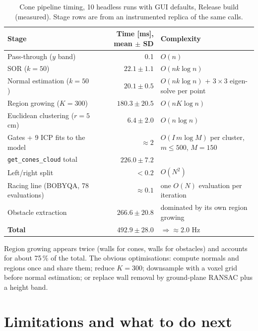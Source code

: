 \documentclass[10pt,a4paper]{scrartcl}
\newcommand{\code}[1]{\texttt{#1}}
\newcommand{\RuleSection}[1]{%
    \section{#1}%
    \vspace{0.2em}{\color{accent!35}\hrule height 0.4pt}\vspace{0.3em}%
  }
\begin{document}
  \begin{table}[H]
  \small
  \centering
  \renewcommand{\arraystretch}{1.05}
  \begin{tabular}{@{}lrl@{}}
  \toprule
  \textbf{Stage} & \textbf{Time [ms], mean $\pm$ SD} & \textbf{Complexity} \\
  \midrule
  Pass-through ($y$ band)            & 0.1          & $O(n)$ \\
  SOR ($k=50$)                      & $22.1\pm1.1$  & $O(nk\log n)$ \\
  Normal estimation ($k=50$)        & $20.1\pm0.5$  & $O(nk\log n)$ + $3\times3$ eigen-solve per point \\
  Region growing ($K=300$)          & $180.3\pm20.5$ & $O(nK\log n)$ \\
  Euclidean clustering ($r=5$ cm)    & $6.4\pm2.0$   & $O(n\log n)$ \\
  Gates + 9 ICP fits to the model   & $\approx2$    & $O(I\,m\log M)$ per cluster, $m\le500$, $M=150$ \\
  \quad \code{get\_cones\_cloud} total & $226.0\pm7.2$ & \\
  Left/right split                  & $<0.2$       & $O(N^2)$ \\
  Racing line (BOBYQA, 78 evaluations) & $\approx0.1$ & one $O(N)$ evaluation per iteration \\
  Obstacle extraction               & $266.6\pm20.8$ & dominated by its own region growing \\
  \textbf{Total}                    & $\bm{492.9\pm28.0}$ & $\Rightarrow\approx2.0$ Hz \\
  \bottomrule
  \end{tabular}
  \caption{Cone pipeline timing, 10 headless runs with GUI defaults, Release build
  (measured). Stage rows are from an instrumented replica of the same calls.}
  \label{tab:conetime}
  \end{table}

  Region growing appears twice (walls for cones, walls for obstacles) and accounts for
  about 75\,\% of the total. The obvious optimisations: compute normals and regions
  once and share them; reduce $K=300$; downsample with a voxel grid before normal
  estimation; or replace wall removal by ground-plane RANSAC plus a height band.

  \RuleSection{Limitations and what to do next}
  \label{sec:limits}
\end{document}
